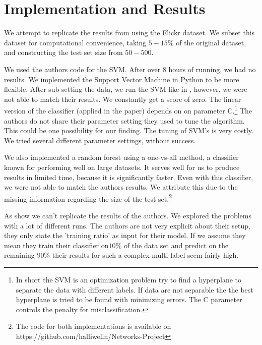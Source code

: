\documentclass[11pt,letterpaper]{article}
\begin{document}
\section*{Implementation and Results}
We attempt to replicate the results from \cite{latent} using the Flickr dataset. We subset this dataset for computational convenience, taking $5-15\%$ of the original dataset, and constructing the test set size from $50 - 500.$ \par
We used the authors code for the SVM. After over $8$ hours of running, we had no results. We implemented the Support Vector Machine in Python to be more flexible. After sub setting the data, we run the SVM like in \cite{latent}, however, we were not able to match their results. We constantly get a score of zero. The linear version of the classifier (applied in the paper) depends on on parameter C.\footnote{In short the SVM is an optimization problem try to find a hyperplane to separate the data with different labels. If data are not separable the the best hyperplane is tried to be found with minimizing errors. The C parameter controls the penalty for misclassification.} The authors do not share their parameter setting they used to tune the algorithm. This could be one possibility for our finding. The tuning of SVM's is very costly. We tried several different parameter settings, without success. \par
We also implemented a random forest using a one-vs-all method, a classifier known for performing well on large datasets. It serves well for us to produce results in limited time, because it is significantly faster. Even with this classifier, we were not able to match the authors results. We attribute this due to the missing information regarding the size of the test set.\footnote{The code for both implementations is available on https://github.com/halliwelln/Networks-Project}\par
As show we can't replicate the results of the authors. We explored the problems with a lot of different runs.
The authors are not very explicit about their setup, they only state the 'training ratio' as input for their model. If we assume they mean they train their classifier on$10 \%$ of the data set and predict on the remaining $90\%$ their results for such a complex multi-label seem fairly high.
\end{document}
